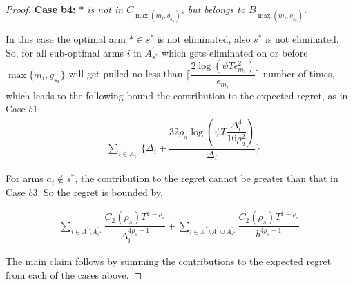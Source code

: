 \begin{proof}
\textbf{Case b4:} \textit{${*}$ is not in $C_{\max(m_{i},g_{s_{k}})}$, but belongs to $B_{\max(m_{i},g_{s_{k}})}$.}

In this case the optimal arm ${*}\in s^{*}$ is not eliminated, also $s^{*}$ is not eliminated. So, for all sub-optimal arms $i$ in $A_{s^*}^{'}$ which gets eliminated on or before $\max \lbrace m_{i},g_{s_{k}} \rbrace$ will get pulled no less than $\bigg\lceil\dfrac{2\log{(\psi T\epsilon_{m_{i}}^{2})}}{\epsilon_{m_{i}}}\bigg\rceil$ number of times, which leads to the following bound the contribution to the expected regret, as in Case $b1$:
% 
\begin{align*}
 &\sum_{i\in A_{s^*}^{'}}\bigg\lbrace \Delta_{i}+\dfrac{32\rho_{a}\log{(\psi T\dfrac{\Delta_{i}^{4}}{16\rho_{a}^{2}})}}{\Delta_{i}} \bigg\rbrace 
\end{align*} 

For arms $a_i \notin s^*$, the contribution to the regret cannot be greater than that in Case $b3$. So the regret is bounded by,

\begin{align*}
\sum_{i\in A^{'}\setminus A_{s^*}^{'}}\dfrac{C_{2}(\rho_{s})T^{1-\rho_{s}}}{\Delta_{i}^{4\rho_{s}-1}} +\sum_{i\in A^{''}\setminus A^{'} \cup A_{s^*}^{'}}\dfrac{C_{2}(\rho_{s})T^{1-\rho_{s}}}{b^{4\rho_{s}-1}}
\end{align*}




The main claim follows by summing the contributions to the expected regret from each of the cases above.
\end{proof}


